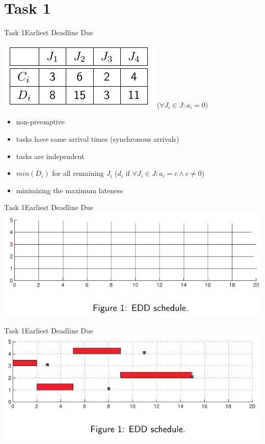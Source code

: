 
\section{Task 1}

\setcounter{task}{1}

\begin{frame}{Task 1}{Earliest Deadline Due}
  \vspace{0.5cm}
  \begin{tasknoinc}
    \centering
    \includegraphics[height=0.2\paperheight]{./figures/1_tab.png}
    ($\forall J_i \in J: a_i = 0$)
  \end{tasknoinc}
  \begin{requirements}
    \begin{itemize}
      \item \alert{non-preemptive}
      \item tasks have \alert{same arrival times} (synchronous arrivals)
      \item tasks are \alert{independent}
      \item $min(D_i)$ for all remaining $J_i$ ($d_i$ if $\forall J_i\in J: a_i=c \wedge c\ne 0$)
      \item \alert{minimizing} the \alert{maximum lateness}
    \end{itemize}
    \centering
  \end{requirements}
\end{frame}

\begin{frame}{Task 1}{Earliest Deadline Due}
  \includegraphics[width=\textwidth]{./figures/1_empty.png}
\end{frame}

\begin{frame}{Task 1}{Earliest Deadline Due}
  \includegraphics[width=\textwidth]{./figures/1_sol.png}
\end{frame}
